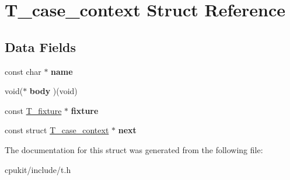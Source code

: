 \hypertarget{structT__case__context}{}\section{T\+\_\+case\+\_\+context Struct Reference}
\label{structT__case__context}
\subsection*{Data Fields}
\begin{DoxyCompactItemize}
\item 
\mbox{\label{structT__case__context_a8f9b8f1a4fb89d05d559da038297c5b4}} 
const char $\ast$ {\bfseries name}
\item 
\mbox{\label{structT__case__context_ac2457e2be2cd742a8598bcb729355a1a}} 
void($\ast$ {\bfseries body} )(void)
\item 
\mbox{\label{structT__case__context_a02b04533804b7070af379d602090b32f}} 
const \mbox{\hyperlink{structT__fixture}{T\+\_\+fixture}} $\ast$ {\bfseries fixture}
\item 
\mbox{\label{structT__case__context_af8dd32c467299a0c0ca946b6a4869d4b}} 
const struct \mbox{\hyperlink{structT__case__context}{T\+\_\+case\+\_\+context}} $\ast$ {\bfseries next}
\end{DoxyCompactItemize}


The documentation for this struct was generated from the following file\+:\begin{DoxyCompactItemize}
\item 
cpukit/include/t.\+h\end{DoxyCompactItemize}
